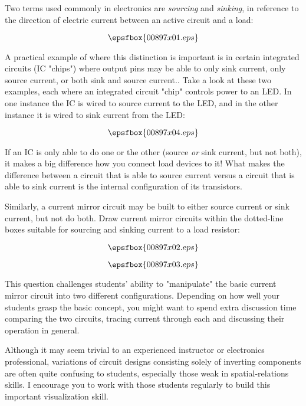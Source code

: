 

Two terms used commonly in electronics are {\it sourcing} and {\it sinking}, in reference to the direction of electric current between an active circuit and a load:

$$\epsfbox{00897x01.eps}$$

A practical example of where this distinction is important is in certain integrated circuits (IC "chips") where output pins may be able to only sink current, only source current, or both sink and source current.. Take a look at these two examples, each where an integrated circuit "chip" controls power to an LED.  In one instance the IC is wired to source current to the LED, and in the other instance it is wired to sink current from the LED:

$$\epsfbox{00897x04.eps}$$

If an IC is only able to do one or the other (source {\it or} sink current, but not both), it makes a big difference how you connect load devices to it!  What makes the difference between a circuit that is able to source current versus a circuit that is able to sink current is the internal configuration of its transistors.

Similarly, a current mirror circuit may be built to either source current or sink current, but not do both.  Draw current mirror circuits within the dotted-line boxes suitable for sourcing and sinking current to a load resistor:

$$\epsfbox{00897x02.eps}$$







$$\epsfbox{00897x03.eps}$$







This question challenges students' ability to "manipulate" the basic current mirror circuit into two different configurations.  Depending on how well your students grasp the basic concept, you might want to spend extra discussion time comparing the two circuits, tracing current through each and discussing their operation in general.

Although it may seem trivial to an experienced instructor or electronics professional, variations of circuit designs consisting solely of inverting components are often quite confusing to students, especially those weak in spatial-relations skills.  I encourage you to work with those students regularly to build this important visualization skill.




